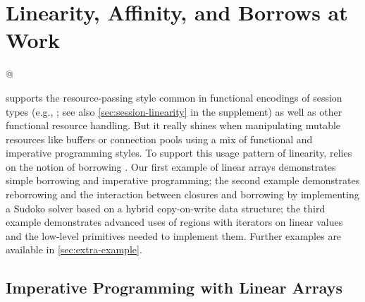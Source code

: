 \section{Linearity, Affinity, and Borrows at Work}
\label{motivation}

\lstMakeShortInline[keepspaces,basicstyle=\small\ttfamily]@

\lang{} supports the resource-passing style
common in functional encodings of session types (e.g.,
\cite{DBLP:journals/jfp/Padovani17}; see also
\cref{sec:session-linearity} in the supplement) as well as other
functional resource handling. But it really shines
when manipulating mutable resources like buffers or connection pools
using a mix of functional and imperative programming styles.
%
To support this usage pattern of linearity, \lang{} relies on
the notion of borrowing \cite{DBLP:conf/popl/BoylandR05}. Our first
example of linear arrays demonstrates simple borrowing and
imperative programming; the second example demonstrates reborrowing
and the interaction between closures and borrowing by implementing a
Sudoko solver based on a hybrid copy-on-write data structure; the
third example demonstrates advanced uses 
of regions with iterators on linear values and the low-level
primitives needed to implement them.
Further examples are available in \cref{sec:extra-example}.

\subsection{Imperative Programming with Linear Arrays}
\label{sec:imper-progr}

